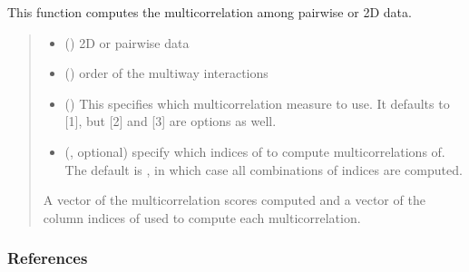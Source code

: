 \documentclass[letterpaper,10pt,english]{sphinxmanual}
\begin{document}

\begin{fulllineitems}
\label{\detokenize{HAT:HAT.HAT.multicorrelations}}
\pysigstartsignatures
{}
\pysigstopsignatures
\sphinxAtStartPar
This function computes the multicorrelation among pairwise or 2D data.
\begin{quote}\begin{description}
\begin{itemize}
\item {} 
\sphinxAtStartPar
{} () \textendash{} 2D or pairwise data

\item {} 
\sphinxAtStartPar
{} () \textendash{} order of the multi\sphinxhyphen{}way interactions

\item {} 
\sphinxAtStartPar
{} () \textendash{} This specifies which multicorrelation measure to use. It defaults to
 {[}1{]}, but  {[}2{]} and  {[}3{]} are options as well.

\item {} 
\sphinxAtStartPar
{} (, optional) \textendash{} specify which indices of  to compute multicorrelations of. The default is , in which case
all combinations of  indices are computed.

\end{itemize}

\sphinxAtStartPar
A vector of the multicorrelation scores computed and a vector of the column indices of
 used to compute each multicorrelation.

\sphinxAtStartPar
{}

\end{description}\end{quote}
\subsubsection*{References}

\end{fulllineitems}
\end{document}
